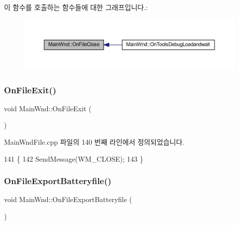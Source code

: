 이 함수를 호출하는 함수들에 대한 그래프입니다.\+:
\nopagebreak
\begin{figure}[H]
\begin{center}
\leavevmode
\includegraphics[width=350pt]{class_main_wnd_abf162c1763ea3246bdac171847fb2d9d_icgraph}
\end{center}
\end{figure}
\mbox{\label{class_main_wnd_a61ca65c37ef1650dfc06de2c3e27891c}} 
\subsubsection{\texorpdfstring{On\+File\+Exit()}{OnFileExit()}}
{\footnotesize\ttfamily void Main\+Wnd\+::\+On\+File\+Exit (\begin{DoxyParamCaption}{ }\end{DoxyParamCaption})\hspace{0.3cm}{\ttfamily [protected]}}



Main\+Wnd\+File.\+cpp 파일의 140 번째 라인에서 정의되었습니다.


\begin{DoxyCode}
141 \{
142   SendMessage(WM\_CLOSE);
143 \}
\end{DoxyCode}
\mbox{\label{class_main_wnd_a0da8957d2bcd55859914b0013c6d21f7}} 
\subsubsection{\texorpdfstring{On\+File\+Export\+Batteryfile()}{OnFileExportBatteryfile()}}
{\footnotesize\ttfamily void Main\+Wnd\+::\+On\+File\+Export\+Batteryfile (\begin{DoxyParamCaption}{ }\end{DoxyParamCaption})\hspace{0.3cm}{\ttfamily [protected]}}



